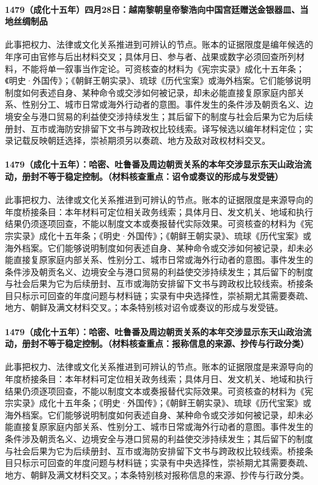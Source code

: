 \paragraph{1479（成化十五年）四月28日：越南黎朝皇帝黎浩向中国宫廷赠送金银器皿、当地丝绸制品} 此事把权力、法律或文化关系推进到可辨认的节点。账本的证据限度是编年候选的年序可由官修与后出材料交叉；具体月日、参与者、战果或数字必须回查所列材料，不能将单一叙事当作定论。可资核查的材料为《宪宗实录》成化十五年条；《明史·外国传》；《朝鲜王朝实录》、琉球《历代宝案》或海外档案。它们能够说明制度如何表述自身、某种命令或交涉如何被记录，却未必能直接复原家庭内部关系、性别分工、城市日常或海外行动者的意图。事件发生的条件涉及朝贡名义、边境安全与港口贸易的利益使交涉持续发生；其后留下的制度与社会后果为它为后续册封、互市或海防安排留下文书与跨政权比较线索。译写候选以编年材料定位；实录记载反映朝廷选择，崇祯期须另以奏疏、地方及敌对政权材料交叉。

\paragraph{1479（成化十五年）：哈密、吐鲁番及周边朝贡关系的本年交涉显示东天山政治流动，册封不等于稳定控制。（材料核查重点：诏令或奏议的形成与发受链）} 此事把权力、法律或文化关系推进到可辨认的节点。账本的证据限度是来源导向的年度桥接条目：本年材料可定位相关政务线索；具体月日、发文机关、地域和执行结果仍须逐项回查，不能以制度文本或奏报替代实际效果。可资核查的材料为《宪宗实录》成化十五年条；《明史·外国传》；《朝鲜王朝实录》、琉球《历代宝案》或海外档案。它们能够说明制度如何表述自身、某种命令或交涉如何被记录，却未必能直接复原家庭内部关系、性别分工、城市日常或海外行动者的意图。事件发生的条件涉及朝贡名义、边境安全与港口贸易的利益使交涉持续发生；其后留下的制度与社会后果为它为后续册封、互市或海防安排留下文书与跨政权比较线索。桥接条目只标示可回查的年度问题与材料链；实录有中央选择性，崇祯期尤其需要奏疏、地方、朝鲜及满文材料交叉。；本条特别核对诏令或奏议的形成与发受链。

\paragraph{1479（成化十五年）：哈密、吐鲁番及周边朝贡关系的本年交涉显示东天山政治流动，册封不等于稳定控制。（材料核查重点：报称信息的来源、抄传与行政分类）} 此事把权力、法律或文化关系推进到可辨认的节点。账本的证据限度是来源导向的年度桥接条目：本年材料可定位相关政务线索；具体月日、发文机关、地域和执行结果仍须逐项回查，不能以制度文本或奏报替代实际效果。可资核查的材料为《宪宗实录》成化十五年条；《明史·外国传》；《朝鲜王朝实录》、琉球《历代宝案》或海外档案。它们能够说明制度如何表述自身、某种命令或交涉如何被记录，却未必能直接复原家庭内部关系、性别分工、城市日常或海外行动者的意图。事件发生的条件涉及朝贡名义、边境安全与港口贸易的利益使交涉持续发生；其后留下的制度与社会后果为它为后续册封、互市或海防安排留下文书与跨政权比较线索。桥接条目只标示可回查的年度问题与材料链；实录有中央选择性，崇祯期尤其需要奏疏、地方、朝鲜及满文材料交叉。；本条特别核对报称信息的来源、抄传与行政分类。

